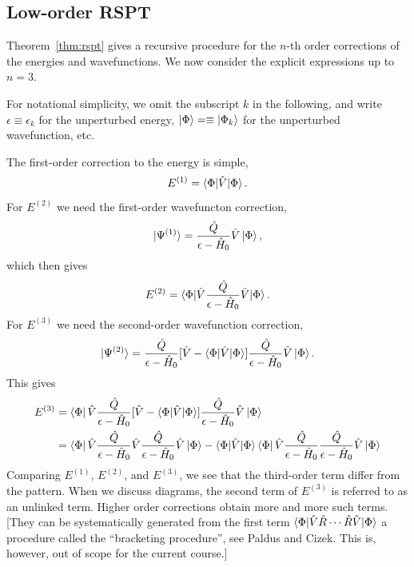 \documentclass{report}
\theoremstyle{plain}
\theoremstyle{definition}
\begin{document}
\subsection{Low-order RSPT}

Theorem~\ref{thm:rspt} gives a recursive procedure for the $n$-th
order corrections of the energies and wavefunctions. We now consider
the explicit expressions up to $n=3$.

For notational simplicity, we omit the subscript $k$ in the
following, and write $\epsilon \equiv \epsilon_k$ for the unperturbed
energy, $\ket{\Phi}=\equiv\ket{\Phi_k}$ for the unperturbed
wavefunction, etc.

The first-order correction to the energy is simple,
\begin{equation}
  E^{(1)} = \braket{\Phi|\hat{V}|\Phi}.
\end{equation}
For $E^{(2)}$ we need the first-order wavefuncton correction,
\begin{equation}
  \ket{\Psi^{(1)}} = \frac{\hat{Q}}{\epsilon-\hat{H}_0} \hat{V} \ket{\Phi},
\end{equation}
which then gives
\begin{equation}
  E^{(2)} = \braket{\Phi|\hat{V}\frac{\hat{Q}}{\epsilon-\hat{H}_0} \hat{V} |\Phi}.
\end{equation}
For $E^{(3)}$ we need the second-order wavefunction correction,
\begin{equation}
  \ket{\Psi^{(2)}} = \frac{\hat{Q}}{\epsilon-\hat{H}_0} [\hat{V} -
  \braket{\Phi|\hat{V}|\Phi}] \frac{\hat{Q}}{\epsilon - \hat{H}_0}
  \hat{V} \ket{\Phi}. \label{eq:second-order-psi}
\end{equation}
This gives
\begin{equation}
  \begin{split}
    E^{(3)} &= \bra{\Phi}\hat{V}\frac{\hat{Q}}{\epsilon-\hat{H}_0}
    [\hat{V} - \braket{\Phi|\hat{V}|\Phi}] \frac{\hat{Q}}{\epsilon -
      \hat{H}_0} \hat{V} \ket{\Phi} 
    \\
    &= \bra{\Phi}\hat{V}\frac{\hat{Q}}{\epsilon-\hat{H}_0} \hat{V}
    \frac{\hat{Q}}{\epsilon - \hat{H}_0} \hat{V} \ket{\Phi} -
    \braket{\Phi|\hat{V}|\Phi}
    \bra{\Phi}\hat{V}\frac{\hat{Q}}{\epsilon-\hat{H}_0}
    \frac{\hat{Q}}{\epsilon - \hat{H}_0} \hat{V}
    \ket{\Phi} 
    \label{eq:third-order-e}
  \end{split}   
\end{equation}
Comparing $E^{(1)}$, $E^{(2)}$, and $E^{(3)}$, we see that the
third-order term differ from the pattern. When we discuss diagrams,
the second term of $E^{(3)}$ is referred to as an unlinked
term. Higher order corrections obtain more and more such terms. [They
can be systematically generated from the first term
$\braket{\Phi|\hat{V}\hat{R}\cdots\hat{R}\hat{V}|\Phi}$ a procedure called the
``bracketing procedure'', see Paldus and Cizek. This is, however, out
of scope for the current course.]
\end{document}
